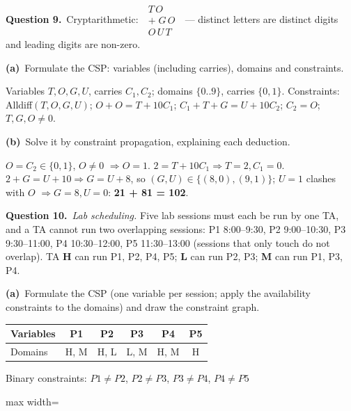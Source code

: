 \documentclass[11pt,a4paper]{article}
\newcommand{\question}[1]{\par\medskip\noindent\textbf{Question #1.}\ }
\newcommand{\subq}[1]{\par\smallskip\noindent\textbf{#1}\ }
\begin{document}
\question{9}Cryptarithmetic: $\;\begin{array}{r} T\,O\\ +\;G\,O\\ \hline O\,U\,T\end{array}\;$ --- distinct letters are distinct digits and leading digits are non-zero.
\subq{(a)}Formulate the CSP: variables (including carries), domains and constraints.
\begin{solbox}
Variables $T,O,G,U$, carries $C_1,C_2$; domains $\{0..9\}$, carries $\{0,1\}$. Constraints: Alldiff$(T,O,G,U)$; $O+O=T+10C_1$; $C_1+T+G=U+10C_2$; $C_2=O$; $T,G,O\neq0$.
\end{solbox}
\subq{(b)}Solve it by constraint propagation, explaining each deduction.
\begin{solbox}
$O=C_2\in\{0,1\}$, $O\ne0$ $\Rightarrow O=1$. $2=T+10C_1\Rightarrow T=2, C_1=0$. $2+G=U+10\Rightarrow G=U+8$, so $(G,U)\in\{(8,0),(9,1)\}$; $U=1$ clashes with $O$ $\Rightarrow G=8,U=0$: \textbf{21 + 81 = 102}.
\end{solbox}
\question{10}\textit{Lab scheduling.} Five lab sessions must each be run by one TA, and a TA cannot run two overlapping sessions: P1 8:00--9:30, P2 9:00--10:30, P3 9:30--11:00, P4 10:30--12:00, P5 11:30--13:00 (sessions that only touch do not overlap). TA \textbf{H} can run P1, P2, P4, P5; \textbf{L} can run P2, P3; \textbf{M} can run P1, P3, P4.
\subq{(a)}Formulate the CSP (one variable per session; apply the availability constraints to the domains) and draw the constraint graph.
\begin{solbox}
\begin{center}\small\begin{tabular}{|l|c|c|c|c|c|}\hline Variables & \textbf{P1} & \textbf{P2} & \textbf{P3} & \textbf{P4} & \textbf{P5}\\ \hline Domains & H, M & H, L & L, M & H, M & H\\ \hline\end{tabular}\end{center}Binary constraints: $P1\ne P2$, $P2\ne P3$, $P3\ne P4$, $P4\ne P5$\begin{center}
\begin{adjustbox}{max width=\linewidth}
\end{adjustbox}
\end{center}
\end{solbox}
\end{document}
